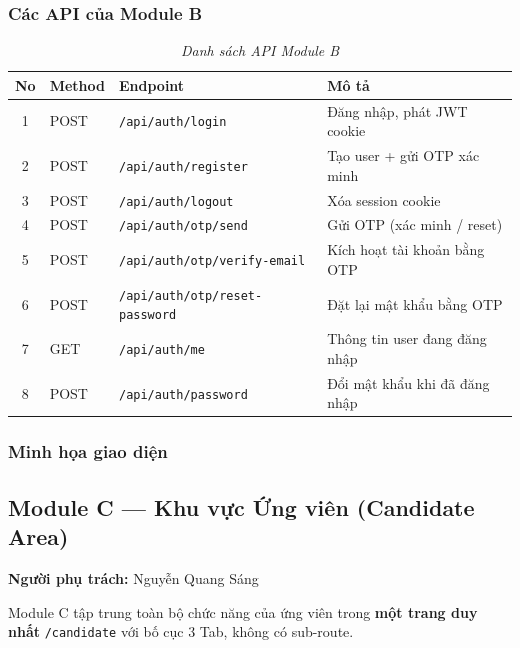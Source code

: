 \subsubsection*{Các API của Module B}
\begin{table}[H]
    \centering
    \renewcommand{\arraystretch}{1.3}
    \begin{tabular}{|c|l|l|l|}
        \hline
        \textbf{No} & \textbf{Method} & \textbf{Endpoint} & \textbf{Mô tả} \\ \hline
        1 & POST & \texttt{/api/auth/login} & Đăng nhập, phát JWT cookie \\ \hline
        2 & POST & \texttt{/api/auth/register} & Tạo user + gửi OTP xác minh \\ \hline
        3 & POST & \texttt{/api/auth/logout} & Xóa session cookie \\ \hline
        4 & POST & \texttt{/api/auth/otp/send} & Gửi OTP (xác minh / reset) \\ \hline
        5 & POST & \texttt{/api/auth/otp/verify-email} & Kích hoạt tài khoản bằng OTP \\ \hline
        6 & POST & \texttt{/api/auth/otp/reset-password} & Đặt lại mật khẩu bằng OTP \\ \hline
        7 & GET & \texttt{/api/auth/me} & Thông tin user đang đăng nhập \\ \hline
        8 & POST & \texttt{/api/auth/password} & Đổi mật khẩu khi đã đăng nhập \\ \hline
    \end{tabular}
    \caption{\textit{Danh sách API Module B}}
\end{table}

\subsubsection*{Minh họa giao diện}

\subsection{Module C --- Khu vực Ứng viên (Candidate Area)}
\textbf{Người phụ trách:} Nguyễn Quang Sáng

Module C tập trung toàn bộ chức năng của ứng viên trong \textbf{một trang duy nhất} \texttt{/candidate} với bố cục 3 Tab, không có sub-route.

